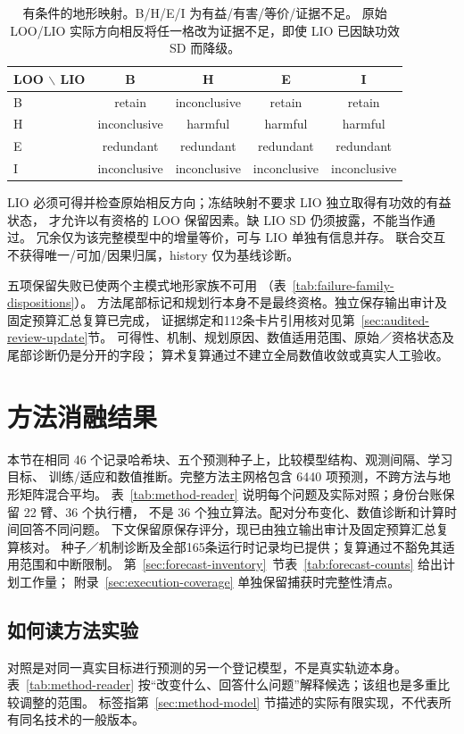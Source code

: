 \documentclass[UTF8,11pt]{ctexart}
\begin{document}
\begin{table}[htbp]
\centering\small
\caption{有条件的地形映射。B/H/E/I 为有益/有害/等价/证据不足。
原始 LOO/LIO 实际方向相反将任一格改为证据不足，即使 LIO 已因缺功效 SD 而降级。}
\label{tab:loo-lio-states}
\begin{tabular}{lcccc}
\toprule
LOO \(\backslash\) LIO & B & H & E & I\\
\midrule
B & retain & inconclusive & retain & retain\\
H & inconclusive & harmful & harmful & harmful\\
E & redundant & redundant & redundant & redundant\\
I & inconclusive & inconclusive & inconclusive & inconclusive\\
\bottomrule
\end{tabular}
\end{table}

LIO 必须可得并检查原始相反方向；冻结映射不要求 LIO 独立取得有功效的有益状态，
才允许以有资格的 LOO 保留因素。缺 LIO SD 仍须披露，不能当作通过。
冗余仅为该完整模型中的增量等价，可与 LIO 单独有信息并存。
联合交互不获得唯一/可加/因果归属，history 仅为基线诊断。

五项保留失败已使两个主模式地形家族不可用
（表~\ref{tab:failure-family-dispositions}）。
方法尾部标记和规划行本身不是最终资格。独立保存输出审计及固定预算汇总复算已完成，
证据绑定和112条卡片引用核对见第~\ref{sec:audited-review-update}节。
可得性、机制、规划原因、数值适用范围、原始／资格状态及尾部诊断仍是分开的字段；
算术复算通过不建立全局数值收敛或真实人工验收。

\section{方法消融结果}
\label{sec:method-results}
本节在相同 46 个记录哈希块、五个预测种子上，比较模型结构、观测间隔、学习目标、
训练/适应和数值推断。完整方法主网格包含 6440 项预测，不跨方法与地形矩阵混合平均。
表~\ref{tab:method-reader} 说明每个问题及实际对照；身份台账保留 22 臂、36 个执行槽，
不是 36 个独立算法。配对分布变化、数值诊断和计算时间回答不同问题。
下文保留原保存评分，现已由独立输出审计及固定预算汇总复算核对。
种子／机制诊断及全部165条运行时记录均已提供；复算通过不豁免其适用范围和中断限制。
第~\ref{sec:forecast-inventory}~节表~\ref{tab:forecast-counts} 给出计划工作量；
附录~\ref{sec:execution-coverage} 单独保留捕获时完整性清点。

\subsection{如何读方法实验}
\label{sec:method-reader}
对照是对同一真实目标进行预测的另一个登记模型，不是真实轨迹本身。
表~\ref{tab:method-reader} 按“改变什么、回答什么问题”解释候选；该组也是多重比较调整的范围。
标签指第~\ref{sec:method-model} 节描述的实际有限实现，不代表所有同名技术的一般版本。
\end{document}
